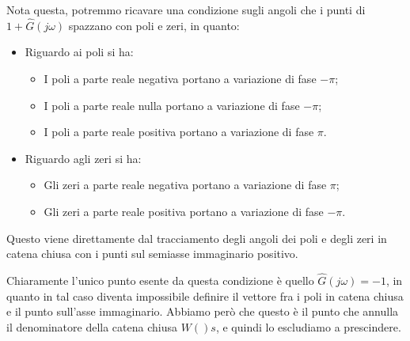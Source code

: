 \documentclass[a4paper,11pt]{article}
\begin{document}
Nota questa, potremmo ricavare una condizione sugli angoli che i punti di $1 + \hat{G}(j\omega)$ spazzano con poli e zeri, in quanto:
\begin{itemize}
	\item Riguardo ai poli si ha:
	\begin{itemize}
		\item I poli a parte reale negativa portano a variazione di fase $-\pi$;
		\item I poli a parte reale nulla portano a variazione di fase $-\pi$;
		\item I poli a parte reale positiva portano a variazione di fase $\pi$.
	\end{itemize}
\item Riguardo agli zeri si ha:
	\begin{itemize}
		\item Gli zeri a parte reale negativa portano a variazione di fase $\pi$;
		\item Gli zeri a parte reale positiva portano a variazione di fase $-\pi$.
	\end{itemize}
\end{itemize}

Questo viene direttamente dal tracciamento degli angoli dei poli e degli zeri in catena chiusa con i punti sul semiasse immaginario positivo.

Chiaramente l'unico punto esente da questa condizione è quello $\hat{G}(j \omega) = -1$, in quanto in tal caso diventa impossibile definire il vettore fra i poli in catena chiusa e il punto sull'asse immaginario.
Abbiamo però che questo è il punto che annulla il denominatore della catena chiusa $W()s$, e quindi lo escludiamo a prescindere.
\end{document}
